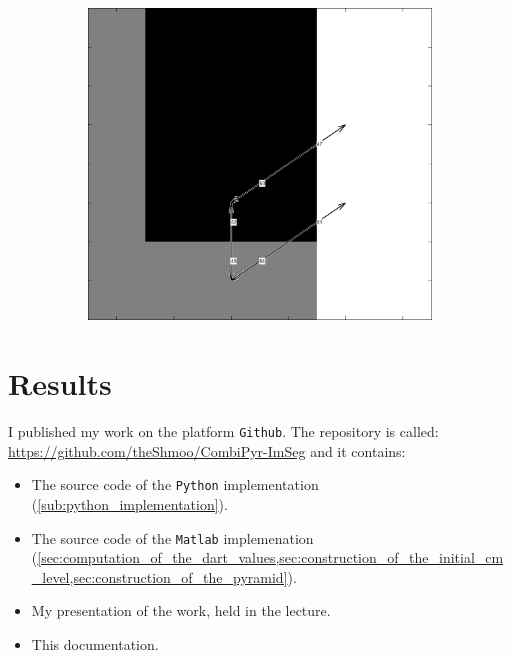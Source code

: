 \documentclass[12pt]{article}
\newif\ifdebug
\newcommand{\todo}[1]{\ifdebug \textcolor{red}{\textit{\textbf{TODO:}} #1}\else \fi}    %
\begin{document}
\begin{figure}[tb]
\begin{subfigure}[b]{0.3\textwidth}
      \caption{}\label{fig:dart_simply3}
    \end{subfigure}
    ~
    \begin{subfigure}[b]{0.3\textwidth}
      \includegraphics[width=\textwidth]{img/simply1.jpg}
      \caption{}\label{fig:dart_simply1}
    \end{subfigure}
  \caption{\todo{caption}}\label{fig:dart_simply}
\end{figure}



\section{Results} %
\label{sec:results}

I published my work on the platform \texttt{Github}\cite{github}. The repository is called: \url{https://github.com/theShmoo/CombiPyr-ImSeg} and it contains:
\begin{itemize}
  \item The source code of the \texttt{Python} implementation (\cref{sub:python_implementation}).
  \item The source code of the \texttt{Matlab} implemenation (\cref{sec:computation_of_the_dart_values,sec:construction_of_the_initial_cm_level,sec:construction_of_the_pyramid}).
  \item My presentation of the work, held in the lecture.
  \item This documentation.
\end{itemize}




\end{document}
